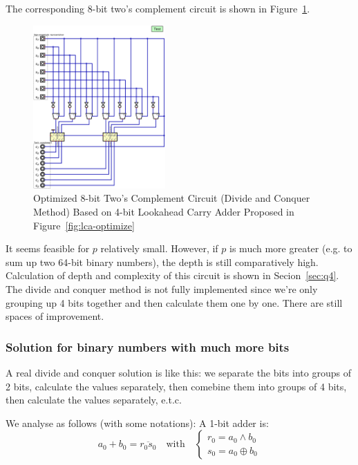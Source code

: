 \documentclass[conference]{IEEEtran}
\begin{document}
The corresponding 8-bit two's complement circuit is shown in Figure~\ref{fig:tc-dq-optimize}.


\begin{figure}[h!]
    \centering
    \includegraphics[width=0.45\textwidth]{assets/twos_complement_dq_copy.png}
    \caption{Optimized 8-bit Two's Complement Circuit (Divide and Conquer Method) Based on 4-bit Lookahead Carry Adder Proposed in Figure~\ref{fig:lca-optimize}}
    \label{fig:tc-dq-optimize}
    \end{figure}
It seems feasible for $p$ relatively small. However, if $p$ is much more greater (e.g. to sum up two 64-bit binary numbers), the depth is still
comparatively high. Calculation of depth and complexity of this circuit is shown in Secion~\ref{sec:q4}. The divide and conquer method is not fully implemented since we're only grouping up 4 bits together and then calculate them one by one. There are still spaces of improvement.


\subsubsection{Solution for binary numbers with much more bits}\label{sec:3-B}

A real divide and conquer solution is like this: we separate the bits into groups of 2 bits, calculate the values separately, then comebine them into groups of 4 bits, then calculate the values separately, e.t.c.

We analyse as follows (with some notations):
A 1-bit adder is: 
\begin{equation}
    a_0 + b_0 = \overline{r_0s_0} \quad \text{with}\quad \begin{cases}
        r_0 = a_0 \wedge b_0 \\
        s_0 = a_0 \oplus b_0
\end{cases}
\end{equation}
\end{document}
